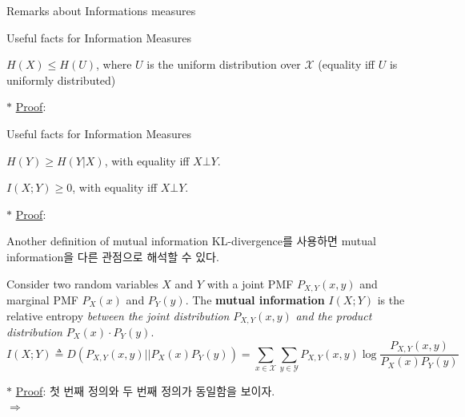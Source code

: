 \documentclass[9pt]{beamer}
\begin{document}
    \begin{section}{Remarks about Informations measures}
        \begin{frame}{Useful facts for Information Measures}
            \begin{theorem}
                $H(X) \le H(U)$, where $U$ is the uniform distribution over $\mathcal X$ (equality iff $U$ is uniformly distributed)
            \end{theorem}
            
            $\ast$ \underline{Proof}:
        
        \end{frame}

        \begin{frame}{Useful facts for Information Measures}
            \begin{theorem}
                $H(Y) \ge H(Y|X)$, with equality iff $X \bot Y$.
            \end{theorem}
            
            \begin{theorem}
                $I(X; Y) \ge 0$, with equality iff $X \bot Y$.
            \end{theorem}
            
            $\ast$ \underline{Proof}:
        
        \end{frame}
        
        \begin{frame}{Another definition of mutual information}
            KL-divergence를 사용하면 mutual information을 다른 관점으로 해석할 수 있다.
            \begin{definition}
                Consider two random variables $X$ and $Y$ with a joint PMF $P_{X,Y}(x, y)$ and marginal PMF $P_X(x)$ and $P_Y(y)$.
                The \textbf{mutual information} $I (X; Y )$ is the relative entropy \textit{between the joint distribution} $P_{X,Y}(x,y)$ \textit{and the product distribution} $P_X(x)\cdot P_Y(y)$.
                $$I(X;Y) \triangleq D(P_{X,Y}(x,y) || P_{X}(x)P_Y(y)) = \sum_{x \in \mathcal X} \sum_{y \in \mathcal Y} P_{X,Y}(x,y) \log \frac{P_{X,Y}(x,y)}{P_X(x) P_Y(y)}$$
            \end{definition}
            
            $\ast$ \underline{Proof}: 첫 번째 정의와 두 번째 정의가 동일함을 보이자.
            \\ $\Rightarrow$
            \vspace{3cm}
        

\end{frame}
\end{section}
\end{document}
